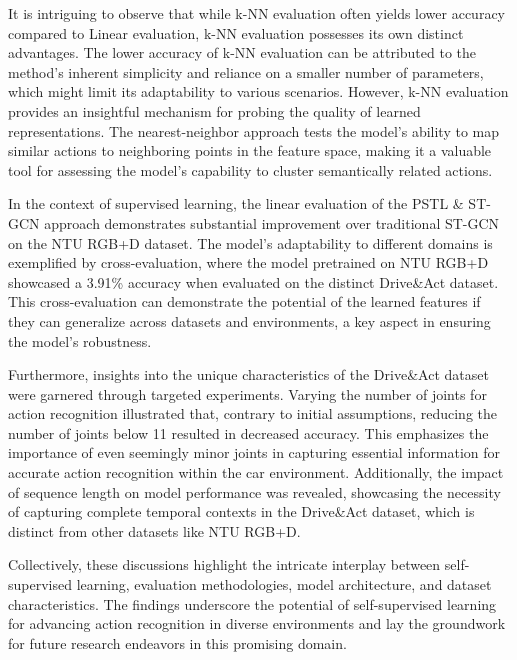 It is intriguing to observe that while k-NN evaluation often yields lower accuracy compared to Linear evaluation, k-NN evaluation possesses its own distinct advantages. The lower accuracy of k-NN evaluation can be attributed to the method's inherent simplicity and reliance on a smaller number of parameters, which might limit its adaptability to various scenarios. However, k-NN evaluation provides an insightful mechanism for probing the quality of learned representations. The nearest-neighbor approach tests the model's ability to map similar actions to neighboring points in the feature space, making it a valuable tool for assessing the model's capability to cluster semantically related actions.

In the context of supervised learning, the linear evaluation of the PSTL \& ST-GCN approach demonstrates substantial improvement over traditional ST-GCN on the NTU RGB+D dataset. The model's adaptability to different domains is exemplified by cross-evaluation, where the model pretrained on NTU RGB+D showcased a 3.91\% accuracy when evaluated on the distinct Drive\&Act dataset. This cross-evaluation can demonstrate the potential of the learned features if they can generalize across datasets and environments, a key aspect in ensuring the model's robustness.

Furthermore, insights into the unique characteristics of the Drive\&Act dataset were garnered through targeted experiments. Varying the number of joints for action recognition illustrated that, contrary to initial assumptions, reducing the number of joints below 11 resulted in decreased accuracy. This emphasizes the importance of even seemingly minor joints in capturing essential information for accurate action recognition within the car environment. Additionally, the impact of sequence length on model performance was revealed, showcasing the necessity of capturing complete temporal contexts in the Drive\&Act dataset, which is distinct from other datasets like NTU RGB+D.

Collectively, these discussions highlight the intricate interplay between self-supervised learning, evaluation methodologies, model architecture, and dataset characteristics. The findings underscore the potential of self-supervised learning for advancing action recognition in diverse environments and lay the groundwork for future research endeavors in this promising domain.

